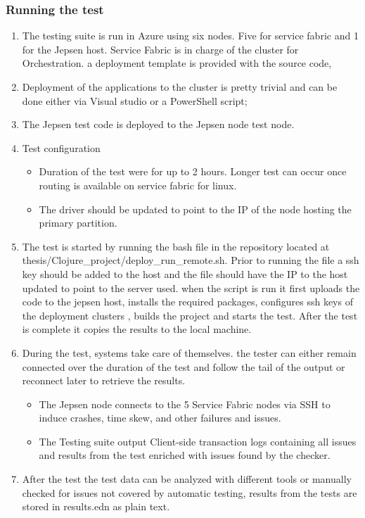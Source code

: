 \documentclass[a4paper,10pt,titlepage]{report}
\begin{document}
\subsubsection{Running the test}

\begin{enumerate}
    \item The testing suite is run in Azure using six nodes. Five for service fabric and 1 for the Jepsen host. Service Fabric is in charge of the cluster for Orchestration. a deployment template is provided with the source code,
    \item Deployment of the applications to the cluster is pretty trivial and can be done either via Visual studio or a PowerShell script; 
    \item The Jepsen test code is deployed to the Jepsen node test node. 
    \item Test configuration
    \begin{itemize}
        \item Duration of the test were for up to 2 hours. Longer test can occur once routing is available on service fabric for linux.
        \item The driver should be updated to point to the IP of the node hosting the primary partition. 
    \end{itemize}
    \item The test is started by running the bash file in the repository located at thesis/Clojure\_project/deploy\_run\_remote.sh. Prior to running the file a ssh key should be added to the host and the file should have the IP to the host updated to point to the server used. when the script is run it first uploads the code to the jepsen host, installs the required packages, configures ssh keys of the deployment clusters , builds the project and starts the test. After the test is complete it copies the results to the local machine.
    \item During the test, systems take care of themselves. the tester can either remain connected over the duration of the test and follow the tail of the output or reconnect later to retrieve the results.
    \begin{itemize}
        \item  The Jepsen node connects to the 5 Service Fabric nodes via SSH to induce crashes, time skew, and other failures and issues.
        \item The Testing suite output Client-side transaction logs containing all issues and results from the test enriched with issues found by the checker.
    \end{itemize}
    \item After the test the test data can be analyzed with different tools or manually checked for issues not covered by automatic testing, results from the tests are stored in results.edn as plain text.
\end{enumerate}
 
\end{document}
